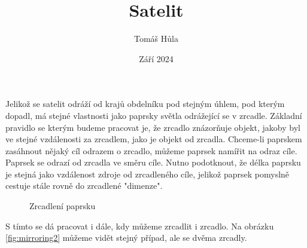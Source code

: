 \documentclass[11pt, a4paper]{article}
\title{Satelit}
\author{Tomáš Hůla}
\date{Září 2024}
\begin{document}
    \maketitle

    Jelikož se satelit odráží od krajů obdelníku pod stejným úhlem, pod kterým dopadl, má stejné vlastnosti jako paprsky světla odrážející se v zrcadle.
    Základní pravidlo se kterým budeme pracovat je, že zrcadlo znázorňuje objekt, jakoby byl ve stejné vzdálenosti za zrcadlem, jako je objekt od zrcadla.
    Chceme-li paprskem zasáhnout nějaký cíl odrazem o zrcadlo, můžeme paprsek namířit na odraz cíle.
    Paprsek se odrazí od zrcadla ve směru cíle.
    Nutno podotknout, že délka paprsku je stejná jako vzdálenost zdroje od zrcadleného cíle, jelikož paprsek pomyslně cestuje stále rovně do zrcadlené "dimenze".

    \begin{figure}[h]
        \centering
        \caption{Zrcadlení paprsku}
        \label{fig:mirroring1}
    \end{figure}

    S tímto se dá pracovat i dále, kdy můžeme zrcadlit i zrcadlo.
    Na obrázku \ref{fig:mirroring2} můžeme vidět stejný případ, ale se dvěma zrcadly.
\end{document}
